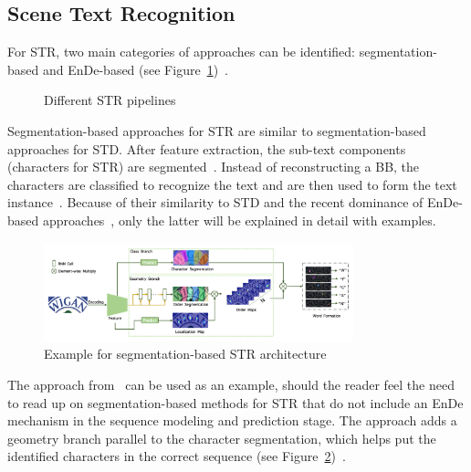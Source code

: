 \subsection{Scene Text Recognition}
For \ac{STR}, two main categories of approaches can be identified: segmentation-based and
\ac{EnDe}-based (see Figure~\ref{fig:str-pipelines})~\citep{chen_text_2021}.
\begin{figure}[h]
    \centering
    
    \caption{Different STR pipelines\label{fig:str-pipelines}}
\end{figure}
Segmentation-based approaches for \ac{STR} are similar to segmentation-based approaches for \ac{STD}.
After feature extraction, the sub-text components (characters for \ac{STR}) are
segmented~\citep{chen_text_2021}.
Instead of reconstructing a \ac{BB}, the characters are classified to recognize the
text and are then used to form the text instance~\citep{chen_text_2021}.
Because of their similarity to \ac{STD} and the recent dominance of \ac{EnDe}-based
approaches~\citep{chen_text_2021,long_scene_2021}, only the latter will be explained in detail with
examples.
\begin{figure}[ht]
    \centering
    \includegraphics[width=0.8\textwidth]{img/STR-seg-based-wan-textscaner-2020.png}
    \caption[Segmentation-based STR architecture]{%
        Example for segmentation-based STR
        architecture~\citep{wan_textscanner_2020}\label{fig:STR-segbased-architecture}
    }
\end{figure}
The approach from~\cite{wan_textscanner_2020} can be used as an example, should the reader feel the
need to read up on segmentation-based methods for \ac{STR} that do not include an \ac{EnDe}
mechanism in the sequence modeling and prediction stage.
The approach adds a geometry branch parallel to the character segmentation, which helps put
the identified characters in the correct sequence (see
Figure~\ref{fig:STR-segbased-architecture})~\citep{wan_textscanner_2020}.

